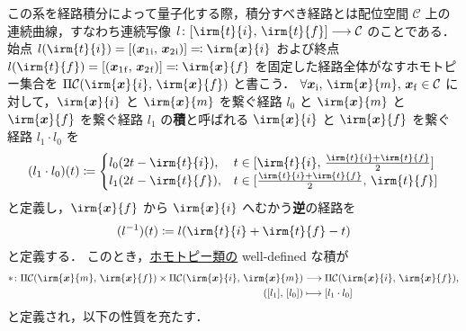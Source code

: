 \documentclass[TQFT_main]{subfiles}
\begin{document}
この系を経路積分によって量子化する際，積分すべき経路とは配位空間 $\mathcal{C}$ 上の連続曲線，すなわち連続写像 $l \colon [\irm{t}{i},\, \irm{t}{f}] \lto \mathcal{C}$ のことである．始点 $l(\irm{t}{i}) = [(\bm{x}_1{}_{\mathrm{i}},\, \bm{x}_2{}_{\mathrm{i}})] \eqqcolon \irm{\bm{x}}{i}$ および終点 $l(\irm{t}{f}) = [(\bm{x}_1{}_{\mathrm{f}},\, \bm{x}_2{}_{\mathrm{f}})] \eqqcolon \irm{\bm{x}}{f}$ を固定した経路全体がなすホモトピー集合を $\Pi \mathcal{C} (\irm{\bm{x}}{i},\, \irm{\bm{x}}{f})$ と書こう．
$\forall \bm{x}_{\mathrm{i}},\, \irm{\bm{x}}{m},\, \bm{x}_{\mathrm{f}} \in \mathcal{C}$ に対して，$\irm{\bm{x}}{i}$ と $\irm{\bm{x}}{m}$ を繋ぐ経路 $l_0$ と $\irm{\bm{x}}{m}$ と $\irm{\bm{x}}{f}$ を繋ぐ経路 $l_1$ の\textbf{積}と呼ばれる $\irm{\bm{x}}{i}$ と $\irm{\bm{x}}{f}$ を繋ぐ経路 $l_1 \cdot l_0$ を
\begin{align}
    (l_1 \cdot l_0)(t) \coloneqq 
    \begin{cases}
        l_0(2t - \irm{t}{i}), &t \in [\irm{t}{i},\, \frac{\irm{t}{i} + \irm{t}{f}}{2}] \\
        l_1(2t - \irm{t}{f}), &t \in [\frac{\irm{t}{i} + \irm{t}{f}}{2},\, \irm{t}{f}]
    \end{cases}
\end{align}
と定義し，$\irm{\bm{x}}{f}$ から $\irm{\bm{x}}{i}$ へむかう\textbf{逆}の経路を
\begin{align}
    (l^{-1})(t) \coloneqq l(\irm{t}{i} + \irm{t}{f} - t)
\end{align}
と定義する．
このとき，\underline{ホモトピー類の} well-defined な積が
\begin{align}
    * \colon \Pi \mathcal{C}(\irm{\bm{x}}{{m}},\, \irm{\bm{x}}{{f}}) \times  \Pi \mathcal{C}(\irm{\bm{x}}{{i}},\, \irm{\bm{x}}{{m}}) &\lto  \Pi \mathcal{C}(\irm{\bm{x}}{{i}},\, \irm{\bm{x}}{{f}}), \\
    ([l_1],\, [l_0]) &\lmto [l_1 \cdot l_0] \label{eq:1-pathprod}
\end{align}
と定義され，以下の性質を充たす．
\end{document}

